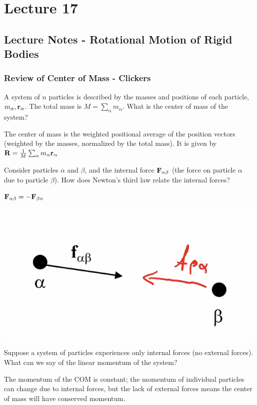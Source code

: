 \section{Lecture 17}
\subsection{Lecture Notes - Rotational Motion of Rigid Bodies}
\subsubsection{Review of Center of Mass - Clickers}
A system of $n$ particles is described by the masses and positions of each particle, $m_\alpha, \mathbf{r}_\alpha$. The total mass is $M = \sum_{\alpha}m_\alpha$. What is the center of mass of the system?
\begin{s}
The center of mass is the weighted positional average of the position vectors (weighted by the masses, normalized by the total mass). It is given by $\mathbf{R} = \frac{1}{M}\sum_{\alpha}m_\alpha\mathbf{r}_{\alpha}$
\end{s}
Consider particles $\alpha$ and $\beta$, and the internal force $\mathbf{F}_{\alpha\beta}$
(the force on particle $\alpha$ due to particle $\beta$). How does Newton's third law relate the internal forces?
\begin{s}
$\mathbf{F}_{\alpha\beta} = -\mathbf{F}_{\beta\alpha}$
\end{s}
\begin{center}
    \includegraphics[scale=0.5]{Lecture-17/l17-img1.png}
\end{center}
Suppose a system of particles experiences only internal forces (no external forces). What can we say of the linear momentum of the system?
\begin{s}
The momentum of the COM is constant; the momentum of individual particles can change due to internal forces, but the lack of external forces means the center of mass will have conserved momentum. 
\end{s}

